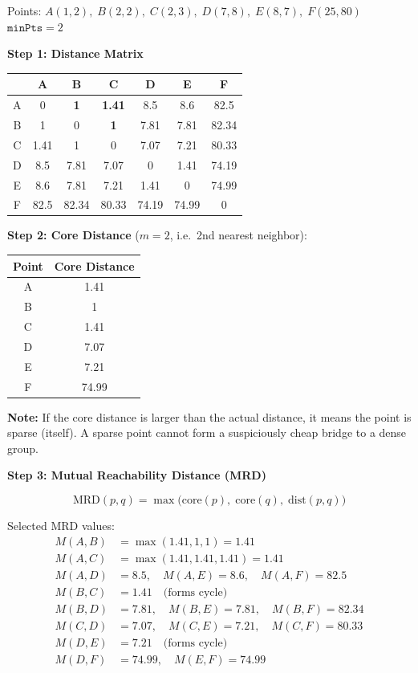 \documentclass[12pt,a4paper]{article}
\begin{document}
\begin{examplebox}
Points: $A(1,2),\; B(2,2),\; C(2,3),\; D(7,8),\; E(8,7),\; F(25,80)$\quad $\texttt{minPts} = 2$

\textbf{Step 1: Distance Matrix}
\begin{center}
\begin{tabular}{ccccccc}
\toprule
 & A & B & C & D & E & F \\
\midrule
A & 0    & \textbf{1}    & \textbf{1.41} & 8.5  & 8.6  & 82.5  \\
B & 1    & 0    & \textbf{1}    & 7.81 & 7.81 & 82.34 \\
C & 1.41 & 1    & 0    & 7.07 & 7.21 & 80.33 \\
D & 8.5  & 7.81 & 7.07 & 0    & 1.41 & 74.19 \\
E & 8.6  & 7.81 & 7.21 & 1.41 & 0    & 74.99 \\
F & 82.5 & 82.34& 80.33& 74.19& 74.99& 0     \\
\bottomrule
\end{tabular}
\end{center}

\textbf{Step 2: Core Distance} ($m = 2$, i.e.\ 2nd nearest neighbor):
\begin{center}
\begin{tabular}{cc}
\toprule
Point & Core Distance \\
\midrule
A & 1.41 \\
B & 1    \\
C & 1.41 \\
D & 7.07 \\
E & 7.21 \\
F & 74.99 \\
\bottomrule
\end{tabular}
\end{center}

\begin{notebox}
\textbf{Note:} If the core distance is larger than the actual distance, it means the point is sparse (itself). A sparse point cannot form a suspiciously cheap bridge to a dense group.
\end{notebox}

\textbf{Step 3: Mutual Reachability Distance (MRD)}

\[
\text{MRD}(p, q) = \max\bigl(\text{core}(p),\; \text{core}(q),\; \text{dist}(p, q)\bigr)
\]

Selected MRD values:
\begin{align*}
M(A,B) &= \max(1.41, 1, 1) = 1.41 \\
M(A,C) &= \max(1.41, 1.41, 1.41) = 1.41 \\
M(A,D) &= 8.5,\quad M(A,E) = 8.6,\quad M(A,F) = 82.5 \\
M(B,C) &= 1.41 \quad \text{(forms cycle)} \\
M(B,D) &= 7.81,\quad M(B,E) = 7.81,\quad M(B,F) = 82.34 \\
M(C,D) &= 7.07,\quad M(C,E) = 7.21,\quad M(C,F) = 80.33 \\
M(D,E) &= 7.21 \quad \text{(forms cycle)} \\
M(D,F) &= 74.99,\quad M(E,F) = 74.99
\end{align*}


\end{examplebox}
\end{document}
